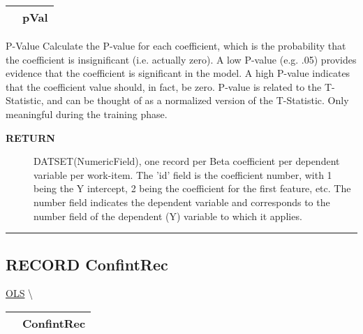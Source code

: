 {\renewcommand{\arraystretch}{1.5}
\begin{tabularx}{\textwidth}{|>{\raggedright\arraybackslash}l|X|}
\hline
\hspace{0pt}\mytexttt{\color{red} } & \textbf{pVal} \\
\hline
\end{tabularx}
}

\par
P-Value Calculate the P-value for each coefficient, which is the probability that the coefficient is insignificant (i.e. actually zero). A low P-value (e.g. .05) provides evidence that the coefficient is significant in the model. A high P-value indicates that the coefficient value should, in fact, be zero. P-value is related to the T-Statistic, and can be thought of as a normalized version of the T-Statistic. Only meaningful during the training phase.

\par
\begin{description}
\item [\colorbox{tagtype}{\color{white} \textbf{\textsf{RETURN}}}] \textbf{\underline{}} DATSET(NumericField), one record per Beta coefficient per dependent variable per work-item. The 'id' field is the coefficient number, with 1 being the Y intercept, 2 being the coefficient for the first feature, etc. The number field indicates the dependent variable and corresponds to the number field of the dependent (Y) variable to which it applies.
\end{description}

\rule{\linewidth}{0.5pt}
\subsection*{\textsf{\colorbox{headtoc}{\color{white} RECORD}
ConfintRec}}

\hypertarget{ecldoc:linearregression.ols.confintrec}{}
\hspace{0pt} \hyperlink{ecldoc:linearregression.ols}{OLS} \textbackslash 

{\renewcommand{\arraystretch}{1.5}
\begin{tabularx}{\textwidth}{|>{\raggedright\arraybackslash}l|X|}
\hline
\hspace{0pt}\mytexttt{\color{red} } & \textbf{ConfintRec} \\
\hline
\end{tabularx}
}

\par


